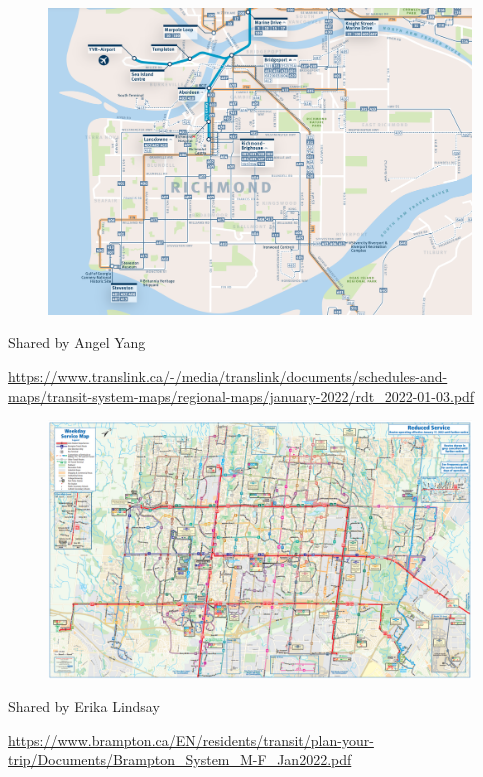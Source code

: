 \documentclass[aspectratio=169]{beamer}
\begin{document}
\begin{frame}
	
	\begin{figure}
		\centering
		\includegraphics[width=0.8\linewidth]{images/richmond.png}
	\end{figure}
	
	\tiny Shared by Angel Yang 
	
	\tiny \url{https://www.translink.ca/-/media/translink/documents/schedules-and-maps/transit-system-maps/regional-maps/january-2022/rdt_2022-01-03.pdf}
	
\end{frame}


\begin{frame}
	
	\begin{figure}
		\centering
		\includegraphics[width=0.93\linewidth]{images/brampton_map.png}
	\end{figure}
	
	\tiny Shared by Erika Lindsay 
	
	\tiny \url{https://www.brampton.ca/EN/residents/transit/plan-your-trip/Documents/Brampton_System_M-F_Jan2022.pdf}
	
\end{frame}
\end{document}
